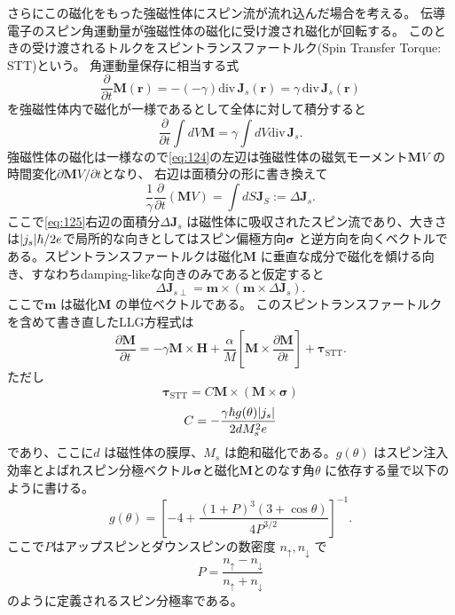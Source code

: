 \documentclass[dvipdfmx]{jsreport}
\numberwithin{equation}{chapter}
\numberwithin{table}{chapter}
\begin{document}
さらにこの磁化をもった強磁性体にスピン流が流れ込んだ場合を考える。
伝導電子のスピン角運動量が強磁性体の磁化に受け渡され磁化が回転する。
このときの受け渡されるトルクをスピントランスファートルク(Spin Transfer Torque: STT)という。
角運動量保存に相当する式
\begin{equation}
\label{eq:123}
\frac{\partial }{\partial t} \bm{M}(\bm{r})=-(-\gamma)\mathrm{div}\,\bm{J}_s(\bm{r})=\gamma\,\mathrm{div}\, \bm{J}_s(\bm{r}) 
\end{equation}
を強磁性体内で磁化が一様であるとして全体に対して積分すると
\begin{equation}
\label{eq:124}
	\frac{\partial }{\partial t} \int dV \bm{M}=\gamma \int dV \mathrm{div}\, \bm{J}_s
.\end{equation}
強磁性体の磁化は一様なので\eqref{eq:124}の左辺は強磁性体の磁気モーメント$\bm{M}V$ の時間変化$\partial \bm{M}V /\partial t$となり、
右辺は面積分の形に書き換えて
\begin{equation}
\label{eq:125}
	\frac{1}{\gamma}\frac{\partial }{\partial t} (\bm{M}V)=\int dS \bm{J}_S:=\Delta \bm{J}_s
.\end{equation}
ここで\eqref{eq:125}右辺の面積分$\Delta \bm{J}_s$ は磁性体に吸収されたスピン流であり、大きさは$\abs{j_s}\hbar /2e$で局所的な向きとしてはスピン偏極方向$\bm{\sigma}$ と逆方向を向くベクトルである。スピントランスファートルクは磁化$\bm{M}$ に垂直な成分で磁化を傾ける向き、すなわちdamping-likeな向きのみであると仮定すると
\begin{equation}
\label{eq:126}
	\Delta \bm{J}_{s\perp}=\bm{m}\times (\bm{m}\times \Delta \bm{J}_s)
.\end{equation}
ここで$\bm{m}$ は磁化$\bm{M}$ の単位ベクトルである。
このスピントランスファートルクを含めて書き直したLLG方程式は
\begin{equation}
\label{eq:127}
\frac{\partial \bm{M}}{\partial t} =-\gamma\bm{M}\times \bm{H}+\frac{\alpha}{M}\left[ \bm{M}\times \frac{\partial \bm{M}}{\partial t}  \right] +\bm{\tau}_\text{STT} 
.\end{equation}
ただし
\begin{equation}
\label{eq:128}
	\bm{\tau}_{\text{STT} }=C \bm{M}\times (\bm{M}\times \bm{\sigma})
\end{equation}
\begin{equation}
\label{eq:129}
	C=-\frac{\gamma\hbar g(\theta) \abs{j_s}}{2dM_s^2e}
\end{equation}
であり、ここに$d$ は磁性体の膜厚、$M_s$ は飽和磁化である。$g(\theta)$ はスピン注入効率とよばれスピン分極ベクトル$\bm{\sigma}$と磁化$\bm{M}$とのなす角$\theta$ に依存する量で以下のように書ける\cite{ku}。
\begin{equation}
\label{eq:s4}
	g(\theta)=\left[ -4+\frac{(1+P)^3(3+\cos \theta)}{4P^{3 /2}} \right] ^{-1}
.\end{equation}
ここで$P$はアップスピンとダウンスピンの数密度 $n_{\uparrow}, n_{\downarrow}$ で
\begin{equation}
\label{eq:s5}
P=\frac{n_{\uparrow}-n_{\downarrow}}{n_{\uparrow}+n_{\downarrow}}
\end{equation}
のように定義されるスピン分極率である。
\end{document}
